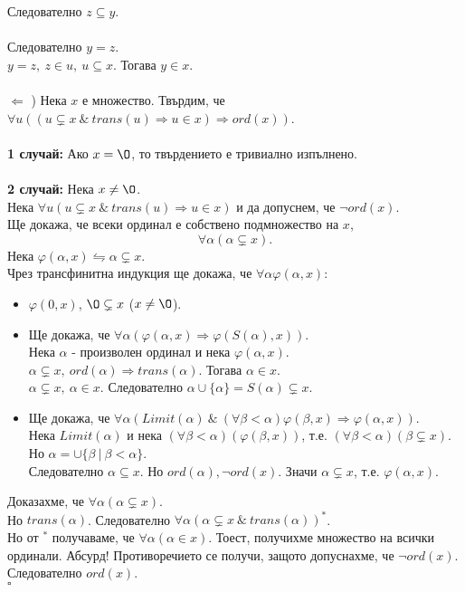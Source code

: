 \documentclass[french]{article}
\begin{document}
	Следователно $z \subseteq y$. \\
	\\
	Следователно $y = z$. \\
	$y = z,\ z \in u,\ u \subseteq x$. Тогава $y \in x$. \\
	\\
	$\Longleftarrow$ ) Нека $x$ е множество. Твърдим, че \\
	$\forall u((u \subsetneq x \ \&\ trans(u)\Rightarrow u \in x) \Rightarrow ord(x))$. \\
	\\
	\textbf{1 случай:} Ако $x = {\O}$, то твърдението е тривиално изпълнено. \\
	\\
	\textbf{2 случай:} Нека $x \not= {\O}$. \\
	Нека $\forall u(u \subsetneq x \ \&\ trans(u)\Rightarrow u \in x)$ и да допуснем, че $\neg ord(x)$. \\
	Ще докажа, че всеки ординал е собствено подмножество на $x$, \\
	$$\forall \alpha(\alpha \subsetneq x).$$
	Нека $\varphi(\alpha, x) \leftrightharpoons \alpha \subsetneq x$. \\ 
	Чрез трансфинитна индукция ще докажа, че $\forall \alpha \varphi(\alpha, x)$: 
	\begin{itemize}
		\item $\varphi(0, x)$, ${\O} \subsetneq x$ ($x \not= {\O}$). 
		
		\item Ще докажа, че $\forall \alpha (\varphi(\alpha, x) \Rightarrow \varphi(S(\alpha), x))$. \\
		Нека $\alpha$ - произволен ординал и нека $\varphi(\alpha, x)$. \\
		$\alpha \subsetneq x,\ ord(\alpha) \Rightarrow trans(\alpha)$. Тогава $\alpha \in x$. \\
		$\alpha \subsetneq x,\ \alpha \in x$. Следователно $\alpha \cup \{\alpha\} = S(\alpha) \subsetneq x$.
		
		\item Ще докажа, че $\forall \alpha (Limit(\alpha)\ \&\ (\forall \beta < \alpha) \varphi(\beta, x) \Rightarrow \varphi(\alpha, x))$. \\
		Нека $Limit(\alpha)$ и нека $(\forall \beta < \alpha) (\varphi(\beta, x))$, т.е. $(\forall \beta < \alpha)(\beta \subsetneq x)$. \\
		Но $\alpha = \cup\{\beta\ |\ \beta < \alpha\}$. \\
		Следователно $\alpha \subseteq x$. Но $ord(\alpha), \neg ord(x)$. Значи $\alpha \subsetneq x$, т.е. $\varphi(\alpha, x)$.			
	\end{itemize}
	Доказахме, че $\forall \alpha(\alpha \subsetneq x)$. \\
	Но $trans(\alpha)$. Следователно $\forall \alpha(\alpha \subsetneq x\ \&\ trans(\alpha))^*$. \\
	Но от $^*$ получаваме, че $\forall \alpha(\alpha \in x)$. Тоест, получихме множество на всички ординали. Абсурд! Противоречието се получи, защото допуснахме, че $\neg ord(x)$. Следователно $ord(x)$. \\
	$\square$	
	
\end{document}
